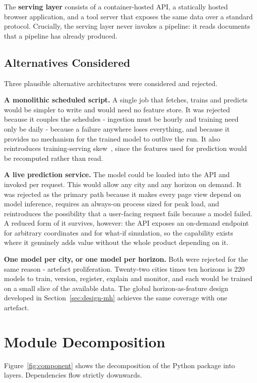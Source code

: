 The \textbf{serving layer} consists of a container-hosted API, a statically hosted
browser application, and a tool server that exposes the same data over a standard
protocol. Crucially, the serving layer never invokes a pipeline: it reads
documents that a pipeline has already produced.

\subsection{Alternatives Considered}
Three plausible alternative architectures were considered and rejected.

\textbf{A monolithic scheduled script.} A single job that fetches, trains and
predicts would be simpler to write and would need no feature store. It was
rejected because it couples the schedules - ingestion must be hourly and
training need only be daily - because a failure anywhere loses everything, and
because it provides no mechanism for the trained model to outlive the run. It
also reintroduces training-serving skew~\cite{ref:techdebt}, since the features
used for prediction would be recomputed rather than read.

\textbf{A live prediction service.} The model could be loaded into the API and
invoked per request. This would allow any city and any horizon on demand. It was
rejected as the primary path because it makes every page view depend on model
inference, requires an always-on process sized for peak load, and reintroduces
the possibility that a user-facing request fails because a model failed. A
reduced form of it survives, however: the API exposes an on-demand endpoint for
arbitrary coordinates and for what-if simulation, so the capability exists where
it genuinely adds value without the whole product depending on it.

\textbf{One model per city, or one model per horizon.} Both were rejected for the
same reason - artefact proliferation. Twenty-two cities times ten horizons is 220
models to train, version, register, explain and monitor, and each would be
trained on a small slice of the available data. The global horizon-as-feature
design developed in Section~\ref{sec:design-mh} achieves the same coverage with
one artefact.

\section{Module Decomposition}
Figure~\ref{fig:component} shows the decomposition of the Python package into
layers. Dependencies flow strictly downwards.

